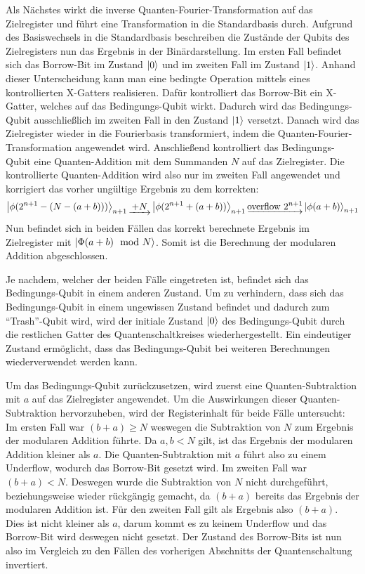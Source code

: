 Als Nächstes wirkt die inverse Quanten-Fourier-Transformation auf das Zielregister und 
führt eine Transformation in die Standardbasis durch.
Aufgrund des Basiswechsels in die Standardbasis beschreiben die Zustände der Qubits des Zielregisters nun das Ergebnis in der Binärdarstellung.
Im ersten Fall befindet sich das Borrow-Bit im Zustand \(\ket{0}\) und im zweiten Fall im Zustand \(\ket{1}\).
Anhand dieser Unterscheidung kann man eine bedingte Operation mittels eines kontrollierten X-Gatters realisieren.
Dafür kontrolliert das Borrow-Bit ein X-Gatter, 
welches auf das Bedingungs-Qubit wirkt.
Dadurch wird das Bedingungs-Qubit ausschließlich im zweiten Fall in den Zustand \(\ket{1}\) versetzt.
Danach wird das Zielregister wieder in die Fourierbasis transformiert, 
indem die Quanten-Fourier-Transformation angewendet wird.
Anschließend kontrolliert das Bedingungs-Qubit eine Quanten-Addition mit dem Summanden \(N\) auf das Zielregister.
Die kontrollierte Quanten-Addition wird also nur im zweiten Fall angewendet und korrigiert das vorher ungültige Ergebnis
zu dem korrekten:
\[
\ket{\phi(2^{n+1}-(N-(a+b)))}_{n+1} \underrightarrow{~+N~} 
\ket{\phi(2^{n+1}+(a+b))}_{n+1} \underrightarrow{\text{overflow }2^{n+1}}
\ket{\phi(a+b)}_{n+1}
  \]
Nun befindet sich in beiden Fällen das korrekt berechnete Ergebnis im Zielregister mit \(\ket{\Phi(a+b)\mod N}\).
Somit ist die Berechnung der modularen Addition abgeschlossen.

Je nachdem, welcher der beiden Fälle eingetreten ist, 
befindet sich das Bedingungs-Qubit in einem anderen Zustand.
Um zu verhindern, dass sich das Bedingungs-Qubit in einem ungewissen Zustand befindet und dadurch zum "`Trash"'-Qubit wird, 
wird der initiale Zustand \(\ket{0}\) des Bedingungs-Qubit durch die restlichen Gatter des Quantenschaltkreises wiederhergestellt.
Ein eindeutiger Zustand ermöglicht, dass das Bedingungs-Qubit bei weiteren Berechnungen wiederverwendet werden kann.

Um das Bedingungs-Qubit zurückzusetzen, 
wird zuerst eine Quanten-Subtraktion mit \(a\) auf das Zielregister angewendet.
Um die Auswirkungen dieser Quanten-Subtraktion hervorzuheben, wird der Registerinhalt für beide Fälle untersucht:
Im ersten Fall war \((b+a) \geq N\) weswegen die Subtraktion von \(N\) zum Ergebnis der modularen Addition führte.
Da \(a, b < N\) gilt, ist das Ergebnis der modularen Addition kleiner als \(a\).
Die Quanten-Subtraktion mit \(a\) führt also zu einem Underflow, wodurch das Borrow-Bit gesetzt wird.
Im zweiten Fall war \((b+a) < N\).
Deswegen wurde die Subtraktion von \(N\) nicht durchgeführt, 
beziehungsweise wieder rückgängig gemacht, da \((b+a)\) bereits das Ergebnis der modularen Addition ist.
Für den zweiten Fall gilt als Ergebnis also \((b+a)\).
Dies ist nicht kleiner als \(a\), 
darum kommt es zu keinem Underflow und das Borrow-Bit wird deswegen nicht gesetzt.
Der Zustand des Borrow-Bits ist nun also im Vergleich zu den Fällen des vorherigen Abschnitts der Quantenschaltung invertiert.

